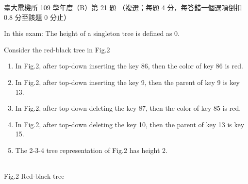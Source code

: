 \begin{pastexam}[label={px:ntu-109-ee-ds-21}]{臺大電機所 109 學年度（B）第 21 題}
（複選；每題 4 分，每答錯一個選項倒扣 0.8 分至該題 0 分止）

In this exam: The height of a singleton tree is defined as 0.

Consider the red-black tree in Fig.2
\begin{enumerate}[label=(\Alph*)]
\item In Fig.2, after top-down inserting the key 86, then the color of key 86 is red.
\item In Fig.2, after top-down inserting the key 9, then the parent of key 9 is key 13.
\item In Fig.2, after top-down deleting the key 87, then the color of key 85 is red.
\item In Fig.2, after top-down deleting the key 10, then the parent of key 13 is key 15.
\item The 2-3-4 tree representation of Fig.2 has height 2.
\end{enumerate}

\begin{center}
\\ Fig.2 Red-black tree
\end{center}
\end{pastexam}


